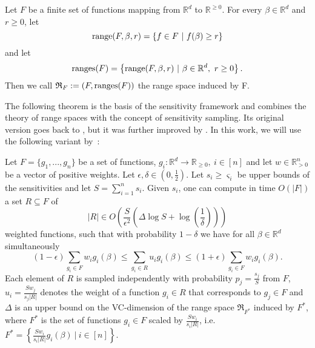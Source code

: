 \begin{definition}
    Let $F$ be a finite set of functions mapping from $\mathbb{R}^d$ to $\mathbb{R}^{\geq 0}$.
    For every $\beta \in \mathbb{R}^d$ and $r \geq 0$, let
    \begin{equation*}
        \textup{range}(F, \beta, r) = \left\{ f \in F \ | \  f(\beta) \geq r  \right\}
    \end{equation*}
    and let
    \begin{equation*}
        \textup{ranges}(F) = \left\{ \textup{range}(F, \beta, r) \ | \ \beta \in \mathbb{R}^d, \ r \geq 0  \right\}.
    \end{equation*}
    Then we call $\mathfrak{R}_F := (F, \textup{ranges}(F))$ the range space induced by F.
\end{definition}

The following theorem is the basis of the sensitivity framework and
combines the theory of range spaces with the concept of
sensitivity sampling. Its original version goes back to
\cite{feldman-langberg-coresets}, but it was
further improved by
\cite{braverman-feldman-coresets}.
In this work, we will use the following variant by~\cite{big-data-tiny-data}:

\begin{theorem}
    \label{theorem:sensitivity-framework}
    Let $F = \{ g_1, ..., g_n \}$ be a set of functions,
    $g_i: \mathbb{R}^d \rightarrow \mathbb{R}_{\geq 0}, \ i \in [n]$
    and let $w \in \mathbb{R}^n_{>0}$ be a vector of positive weights.
    Let $\epsilon, \delta \in (0, \frac{1}{2})$.
    Let $s_i \geq \varsigma_i$ be upper bounds of the sensitivities and
    let $S = \sum_{i=1}^n s_i$.
    Given $s_i$, one can compute in time $O(|F|)$ a set
    $R \subseteq F$ of
    \begin{equation*}
        |R| \in O \left( \frac{S}{\epsilon^2} \left( \Delta \log S + \log \left( \frac{1}{\delta} \right) \right) \right)
    \end{equation*}
    weighted functions, such that with probability $1 - \delta$ we have
    for all $\beta \in \mathbb{R}^d$ simultaneously
    \begin{equation*}
        (1-\epsilon) \sum_{g_i \in F} w_i g_i(\beta) \leq \sum_{g_i \in R} u_i g_i(\beta) \leq (1 + \epsilon) \sum_{g_i \in F} w_i g_i(\beta).
    \end{equation*}
    Each element of $R$ is sampled independently with probability
    $p_j = \frac{s_j}{S}$ from $F$, $u_i = \frac{S w_j}{s_j |R|}$
    denotes the weight of a function $g_i \in R$ that corresponds to
    $g_j \in F$ and $\Delta$ is an upper bound on the
    VC-dimension of the range space $\mathfrak{R}_{F^\ast}$ induced by
    $F^\ast$, where $F^\ast$ is the set of functions $g_i \in F$
    scaled by $\frac{S w_i}{s_i |R|}$, i.e.
    $F^\ast = \left\{ \frac{S w_i}{s_i |R|} g_i(\beta) \ |\ i \in [n] \right\}$.
\end{theorem}

